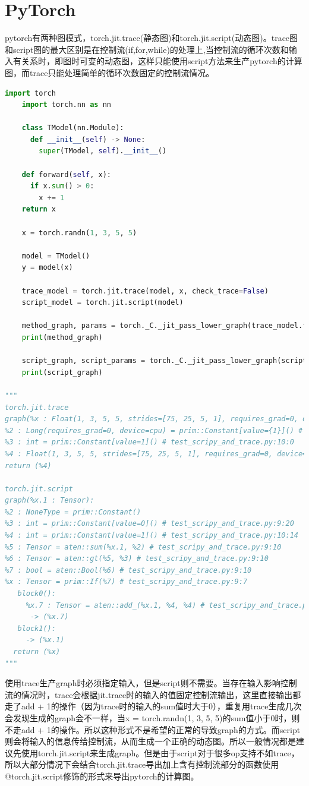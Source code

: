 \documentclass[12pt]{book}
\begin{document}
\section{PyTorch}
pytorch有两种图模式，torch.jit.trace(静态图)和torch.jit.script(动态图)。trace图和script图的最大区别是在控制流(if,for,while)的处理上,当控制流的循环次数和输入有关系时，即图时可变的动态图，这样只能使用script方法来生产pytorch的计算图，而trace只能处理简单的循环次数固定的控制流情况。
\begin{lstlisting}[language=Python, breaklines=true]
	import torch
	import torch.nn as nn
	
	class TModel(nn.Module):
	  def __init__(self) -> None:
        super(TModel, self).__init__()
	
	def forward(self, x):
	  if x.sum() > 0:
	    x += 1
	return x
	
	x = torch.randn(1, 3, 5, 5)
	
	model = TModel()
	y = model(x)
	
	trace_model = torch.jit.trace(model, x, check_trace=False)
	script_model = torch.jit.script(model)
	
	method_graph, params = torch._C._jit_pass_lower_graph(trace_model.forward.graph, trace_model._c)
	print(method_graph)
	
	script_graph, script_params = torch._C._jit_pass_lower_graph(script_model.forward.graph, script_model._c)
	print(script_graph)

"""
torch.jit.trace
graph(%x : Float(1, 3, 5, 5, strides=[75, 25, 5, 1], requires_grad=0, device=cpu)):
%2 : Long(requires_grad=0, device=cpu) = prim::Constant[value={1}]() # test_scripy_and_trace.py:10:0
%3 : int = prim::Constant[value=1]() # test_scripy_and_trace.py:10:0
%4 : Float(1, 3, 5, 5, strides=[75, 25, 5, 1], requires_grad=0, device=cpu) = aten::add_(%x, %2, %3) # test_scripy_and_trace.py:10:0
return (%4)

torch.jit.script
graph(%x.1 : Tensor):
%2 : NoneType = prim::Constant()
%3 : int = prim::Constant[value=0]() # test_scripy_and_trace.py:9:20
%4 : int = prim::Constant[value=1]() # test_scripy_and_trace.py:10:14
%5 : Tensor = aten::sum(%x.1, %2) # test_scripy_and_trace.py:9:10
%6 : Tensor = aten::gt(%5, %3) # test_scripy_and_trace.py:9:10
%7 : bool = aten::Bool(%6) # test_scripy_and_trace.py:9:10
%x : Tensor = prim::If(%7) # test_scripy_and_trace.py:9:7
   block0():
     %x.7 : Tensor = aten::add_(%x.1, %4, %4) # test_scripy_and_trace.py:10:9
      -> (%x.7)
   block1():
     -> (%x.1)
  return (%x)
"""
\end{lstlisting}
使用trace生产graph时必须指定输入，但是script则不需要。当存在输入影响控制流的情况时，trace会根据jit.trace时的输入的值固定控制流输出，这里直接输出都走了add + 1的操作（因为trace时的输入的sum值时大于0），重复用trace生成几次会发现生成的graph会不一样，当x = torch.randn(1, 3, 5, 5)的sum值小于0时，则不走add + 1的操作。所以这种形式不是希望的正常的导致graph的方式。而script则会将输入的信息传给控制流，从而生成一个正确的动态图。所以一般情况都是建议先使用torch.jit.script来生成graph。但是由于script对于很多op支持不如trace，所以大部分情况下会结合torch.jit.trace导出加上含有控制流部分的函数使用@torch.jit.script修饰的形式来导出pytorch的计算图。
\end{document}
